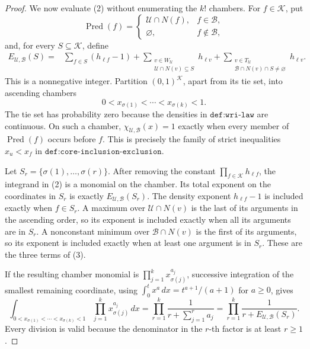 \documentclass{article}
\begin{document}
\begin{proof}
We now evaluate (2) without enumerating the \(k!\) chambers.  For \(f\in\mathcal K\), put
\[
 \operatorname{Pred}(f)=
 \begin{cases}
 \mathcal U\cap N(f),&f\in\mathcal B,\\
 \varnothing,&f\notin\mathcal B,
 \end{cases}
\]
and, for every \(S\subseteq\mathcal K\), define
\[
\begin{split}
 E_{\mathcal U,\mathcal B}(S)={}&
 \sum_{f\in S}(h_{\ell f}-1)
 +\sum_{\substack{v\in W_{\mathcal U}\\
                    \mathcal U\cap N(v)\subseteq S}}h_{\ell v}
 +\sum_{\substack{v\in T_{\mathcal U}\\
                    \mathcal B\cap N(v)\cap S\neq\varnothing}}h_{\ell v}.                 \tag{3}
\end{split}
\]
This is a nonnegative integer.  Partition \((0,1)^{\mathcal K}\), apart from its tie set, into ascending chambers
\[
 0<x_{\sigma(1)}<\cdots<x_{\sigma(k)}<1.
\]
The tie set has probability zero because the densities in \(\texttt{def:wri-law}\) are continuous.  On such a chamber, \(\chi_{\mathcal U,\mathcal B}(x)=1\) exactly when every member of \(\operatorname{Pred}(f)\) occurs before \(f\).  This is precisely the family of strict inequalities \(x_u<x_f\) in \(\texttt{def:core-inclusion-exclusion}\).

Let \(S_r=\{\sigma(1),\ldots,\sigma(r)\}\).  After removing the constant \(\prod_{f\in\mathcal K}h_{\ell f}\), the integrand in (2) is a monomial on the chamber.  Its total exponent on the coordinates in \(S_r\) is exactly \(E_{\mathcal U,\mathcal B}(S_r)\).  The density exponent \(h_{\ell f}-1\) is included exactly when \(f\in S_r\).  A maximum over \(\mathcal U\cap N(v)\) is the last of its arguments in the ascending order, so its exponent is included exactly when all its arguments are in \(S_r\).  A nonconstant minimum over \(\mathcal B\cap N(v)\) is the first of its arguments, so its exponent is included exactly when at least one argument is in \(S_r\).  These are the three terms of (3).

If the resulting chamber monomial is \(\prod_{j=1}^k x_{\sigma(j)}^{a_j}\), successive integration of the smallest remaining coordinate, using \(\int_0^t x^a\,dx=t^{a+1}/(a+1)\) for \(a\geq0\), gives
\[
 \int_{0<x_{\sigma(1)}<\cdots<x_{\sigma(k)}<1}
 \prod_{j=1}^k x_{\sigma(j)}^{a_j}\,dx
 =\prod_{r=1}^k
 \frac{1}{r+\sum_{j=1}^r a_j}
 =\prod_{r=1}^k\frac{1}{r+E_{\mathcal U,\mathcal B}(S_r)}.                    \tag{4}
\]
Every division is valid because the denominator in the \(r\)-th factor is at least \(r\geq1\).


\end{proof}
\end{document}
